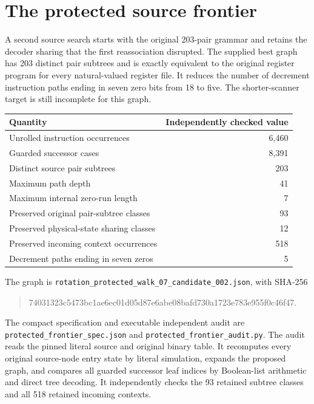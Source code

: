 \section{The protected source frontier}
\label{sec:protected-source-frontier}

A second source search starts with the original 203-pair grammar and
retains the decoder sharing that the first reassociation disrupted.
The supplied best graph has 203 distinct pair subtrees and is exactly
equivalent to the original register program for every natural-valued
register file.  It reduces the number of decrement instruction paths
ending in seven zero bits from 18 to five.  The shorter-scanner target is
still incomplete for this graph.

\begin{center}
\begin{tabular}{lr}
Quantity & Independently checked value\\\hline
Unrolled instruction occurrences & 6,460\\
Guarded successor cases & 8,391\\
Distinct source pair subtrees & 203\\
Maximum path depth & 41\\
Maximum internal zero-run length & 7\\
Preserved original pair-subtree classes & 93\\
Preserved physical-state sharing classes & 12\\
Preserved incoming context occurrences & 518\\
Decrement paths ending in seven zeros & 5
\end{tabular}
\end{center}

The graph is
\texttt{rotation\_protected\_walk\_07\_candidate\_002.json}, with
SHA-256
\begin{quote}\ttfamily\small
74031323c5473bc1ae6ec01d05d87e6abe08bafd730a1723e783e955f0c46f47.
\end{quote}
The compact specification and executable independent audit are
\texttt{protected\_frontier\_spec.json} and
\texttt{protected\_frontier\_audit.py}.  The audit reads the pinned
literal source and original binary table.  It recomputes every original
source-node entry state by literal simulation, expands the proposed
graph, and compares all guarded successor leaf indices by Boolean-list
arithmetic and direct tree decoding.  It independently checks the 93
retained subtree classes and all 518 retained incoming contexts.

